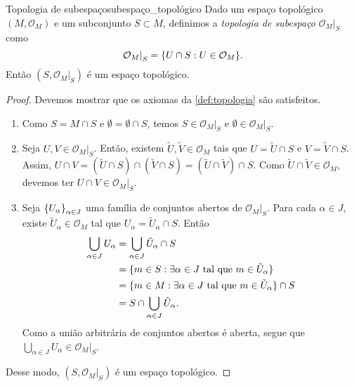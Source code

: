 \documentclass[12pt,a4paper]{article}
\numberwithin{equation}{section}
\DeclarePairedDelimiter\set{\{}{\}}
\newcommand\family[2]{\ensuremath{\set*{#1}_{#2}}}
\newcommand\topology[1]{\ensuremath{\left(#1, \mathcal{O}_{#1}\right)}}
\newcommand\restrict[2]{\ensuremath{\left.#1\right\rvert_{#2}}}
\begin{document}
\begin{proposition}{Topologia de subespaço}{subespaço_topológico}
    Dado um espaço topológico \topology{M} e um subconjunto \(S\subset M\), definimos a \emph{topologia de subespaço} \restrict{\mathcal{O}_M}{S} como
    \begin{equation*}
        \restrict{\mathcal{O}_M}{S} = \set{U \cap S : U \in \mathcal{O}_M}.
    \end{equation*}
    Então \((S, \restrict{\mathcal{O}_M}{S})\) é um espaço topológico.
\end{proposition}
\begin{proof}
    Devemos mostrar que os axiomas da \cref{def:topologia} são satisfeitos.
    \begin{enumerate}[label=(\alph*)]
        \item Como \(S = M \cap S\) e \(\emptyset = \emptyset \cap S\), temos \(S \in \restrict{\mathcal{O}_M}{S}\) e \(\emptyset \in \restrict{\mathcal{O}_M}{S}\).
        \item Seja \(U, V \in \restrict{\mathcal{O}_M}{S}\). Então, existem \(\tilde{U}, \tilde{V} \in \mathcal{O}_M\) tais que \(U = \tilde{U} \cap S\) e \(V = \tilde{V} \cap S\). Assim, \(U \cap V = (\tilde{U}\cap S) \cap (\tilde{V} \cap S) = (\tilde{U}\cap\tilde{V})\cap S\). Como \(\tilde{U} \cap \tilde{V} \in \mathcal{O}_M\), devemos ter \(U \cap V \in \restrict{\mathcal{O}_M}{S}\).
        \item Seja \family{U_\alpha}{\alpha \in J} uma família de conjuntos abertos de \(\restrict{\mathcal{O}_M}{S}\). Para cada \(\alpha \in J\), existe \(\tilde{U}_\alpha\in\mathcal{O}_M\) tal que \(U_\alpha = \tilde{U}_\alpha \cap S\). Então
            \begin{align*}
                \bigcup_{\alpha \in J} U_\alpha &= \bigcup_{\alpha \in J} \tilde{U}_\alpha \cap S\\
                                                &= \set{m \in S : \exists \alpha \in J \text{ tal que } m \in \tilde{U}_\alpha}\\
                                                &= \set{m \in M : \exists \alpha \in J \text{ tal que } m \in \tilde{U}_\alpha} \cap S\\
                                                &= S\cap\bigcup_{\alpha\in J}\tilde{U}_\alpha.
            \end{align*}
        Como a união arbitrária de conjuntos abertos é aberta, segue que \(\bigcup_{\alpha\in J}U_\alpha \in \restrict{\mathcal{O}_M}{S}\).
    \end{enumerate}
    Desse modo, \((S, \restrict{\mathcal{O}_M}{S})\) é um espaço topológico.
\end{proof}
\end{document}
